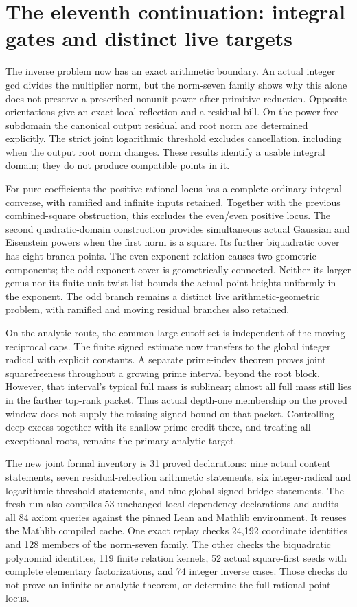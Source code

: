 \section{The eleventh continuation: integral gates and distinct live targets}
\label{integral-status-section}

The inverse problem now has an exact arithmetic boundary. An actual
integer gcd divides the multiplier norm, but the norm-seven family
shows why this alone does not preserve a prescribed nonunit power
after primitive reduction. Opposite orientations give an exact local
reflection and a residual bill. On the power-free subdomain the
canonical output residual and root norm are determined explicitly.
The strict joint logarithmic threshold excludes cancellation, including
when the output root norm changes. These results identify a usable
integral domain; they do not produce compatible points in it.

For pure coefficients the positive rational locus has a complete
ordinary integral converse, with ramified and infinite inputs retained.
Together with the previous combined-square obstruction, this excludes
the even/even positive locus. The second quadratic-domain construction
provides simultaneous actual Gaussian and Eisenstein powers when the
first norm is a square. Its further biquadratic cover has eight branch
points. The even-exponent relation causes two geometric components;
the odd-exponent cover is geometrically connected. Neither its larger
genus nor its finite unit-twist list bounds the actual point heights
uniformly in the exponent. The odd branch remains a distinct live
arithmetic-geometric problem, with ramified and moving residual
branches also retained.

On the analytic route, the common large-cutoff set is independent of
the moving reciprocal caps. The finite signed estimate now transfers
to the global integer radical with explicit constants. A separate
prime-index theorem proves joint squarefreeness throughout a growing
prime interval beyond the root block. However, that interval's typical
full mass is sublinear; almost all full mass still lies in the farther
top-rank packet. Thus actual depth-one membership on the proved
window does not supply the missing signed bound on that packet.
Controlling deep excess together with its shallow-prime credit there,
and treating all exceptional roots, remains the primary analytic target.

The new joint formal inventory is 31 proved declarations: nine actual
content statements, seven residual-reflection arithmetic statements,
six integer-radical and logarithmic-threshold statements, and nine
global signed-bridge statements. The fresh run also compiles 53
unchanged local dependency declarations and audits all 84 axiom
queries against the pinned Lean and Mathlib environment. It reuses
the Mathlib compiled cache. One exact replay checks 24,192 coordinate
identities and 128 members of the norm-seven family. The other checks
the biquadratic polynomial identities, 119 finite relation kernels,
52 actual square-first seeds with complete elementary factorizations,
and 74 integer inverse cases. Those checks do not prove an infinite
or analytic theorem, or determine the full rational-point locus.

